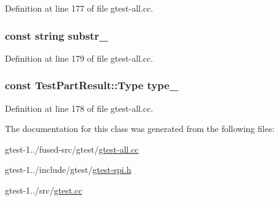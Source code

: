 \-Definition at line 177 of file gtest-\/all.\-cc.

\hypertarget{classtesting_1_1internal_1_1SingleFailureChecker_a6d511a37e5638d646986452a9b195d23}{
\subsubsection[{substr\-\_\-}]{\setlength{\rightskip}{0pt plus 5cm}const {\bf string} {\bf substr\-\_\-}}}\label{d8/d07/classtesting_1_1internal_1_1SingleFailureChecker_a6d511a37e5638d646986452a9b195d23}


\-Definition at line 179 of file gtest-\/all.\-cc.

\hypertarget{classtesting_1_1internal_1_1SingleFailureChecker_a3155cc24deee3978aed78a25da6180da}{
\subsubsection[{type\-\_\-}]{\setlength{\rightskip}{0pt plus 5cm}const {\bf \-Test\-Part\-Result\-::\-Type} {\bf type\-\_\-}}}\label{d8/d07/classtesting_1_1internal_1_1SingleFailureChecker_a3155cc24deee3978aed78a25da6180da}


\-Definition at line 178 of file gtest-\/all.\-cc.



\-The documentation for this class was generated from the following files\-:\begin{DoxyCompactItemize}
\item 
gtest-\/1../fused-\/src/gtest/\hyperlink{fused-src_2gtest_2gtest-all_8cc}{gtest-\/all.\-cc}\item 
gtest-\/1../include/gtest/\hyperlink{gtest-spi_8h}{gtest-\/spi.\-h}\item 
gtest-\/1../src/\hyperlink{gtest_8cc}{gtest.\-cc}\end{DoxyCompactItemize}
